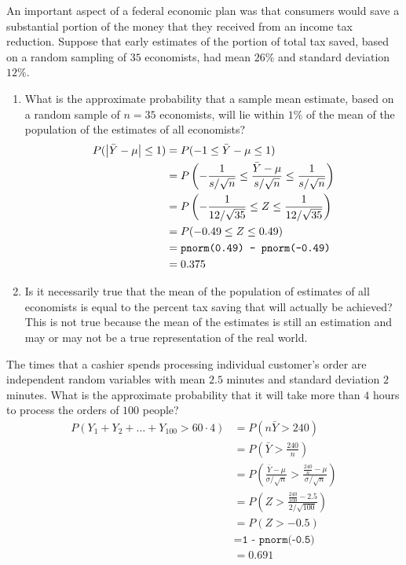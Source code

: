 \documentclass[12pt]{article}
\newcommand{\ques}[1]{\noindent {\bf Question #1: }}
\begin{document}
\ques{7.48} An important aspect of a federal economic plan was that consumers would save a substantial portion of the money that they received from an income tax reduction. Suppose that early estimates of the portion of total tax saved, based on a random sampling of $35$ economists, had mean $26\%$ and standard deviation $12\%$. \begin{enumerate}
\item What is the approximate probability that a sample mean estimate, based on a random sample of $n=35$ economists, will lie within $1\%$ of the mean of the population of the estimates of all economists? 
$$ \begin{aligned} P(\abs{\bar{Y} - \mu} \leq 1) &= P(-1 \leq \bar{Y} - \mu \leq 1) \\ &= P\left( -\frac{1}{s/\sqrt{n}} \leq \frac{\bar{Y} - \mu}{s / \sqrt{n}} \leq \frac{1}{s/\sqrt{n}} \right) \\ &= P\left( -\frac{1}{12 / \sqrt{35}} \leq Z \leq \frac{1}{12/\sqrt{35}}\right) \\ &= P(-0.49 \leq Z \leq 0.49) \\ &= \texttt{pnorm(0.49) - pnorm(-0.49)} \\ &= 0.375 \end{aligned} $$ 

\item Is it necessarily true that the mean of the population of estimates of all economists is equal to the percent tax saving that will actually be achieved? \\ 
This is not true because the mean of the estimates is still an estimation and may or may not be a true representation of the real world.

\end{enumerate}


\ques{7.62} The times that a cashier spends processing individual customer's order are independent random variables with mean $2.5$ minutes and standard deviation $2$ minutes. What is the approximate probability that it will take more than $4$ hours to process the orders of $100$ people? 
$$ \begin{aligned} P(Y_1+Y_2 + \dots + Y_{100} > 60 \cdot 4) &= P(n\bar{Y} > 240) \\ &= P\left(\bar{Y} > \frac{240}{n}\right) \\ &= P\left( \frac{\bar{Y} - \mu}{\sigma / \sqrt{n}} > \frac{\frac{240}{n} - \mu}{\sigma / \sqrt{n}}\right) \\ &= P\left(Z > \frac{\frac{240}{100} - 2.5}{2/\sqrt{100}}\right) \\ &= P(Z > -0.5) \\ &= \texttt{1 - pnorm(-0.5)} \\ &= 0.691 \end{aligned} $$ 
\end{document}

